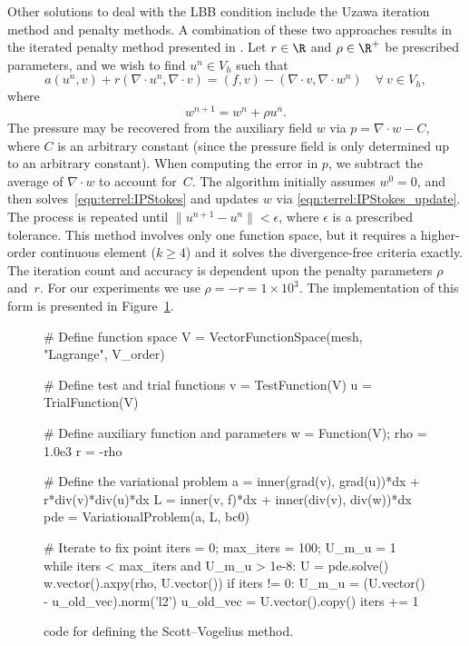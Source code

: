 Other solutions to deal with the LBB condition include the Uzawa
iteration method and penalty methods.  A combination of these two
approaches results in the iterated penalty method presented in
\citet{ScottVogelius1985}. Let $r \in \R$ and $\rho \in \R^{+}$ be
prescribed parameters, and we wish to find $u^n \in V_{h}$ such that
\begin{equation}
\label{eqn:terrel:IPStokes}
 a(u^n, v) + r(\nabla \cdot u^n, \nabla \cdot v)
      =  (f, v) - (\nabla\cdot v, \nabla \cdot w^n) \quad \forall \ v \in V_{h},
\end{equation}
%
where
%
\begin{equation}
\label{eqn:terrel:IPStokes_update}
   w^{n+1} = w^n + \rho u^n.
\end{equation}
%
The pressure may be recovered from the auxiliary field $w$ via $p =
\nabla\cdot w - C$, where $C$ is an arbitrary constant (since the
pressure field is only determined up to an arbitrary constant).
When computing the error in $p$, we subtract the average of $\nabla
\cdot w$ to account for~$C$. The algorithm initially assumes $w^0 =
0$, and then solves~\eqref{eqn:terrel:IPStokes} and updates $w$ via
\eqref{eqn:terrel:IPStokes_update}. The process is repeated until
$\|u^{n+1} - u^{n}\| < \epsilon$, where $\epsilon$ is a prescribed
tolerance. This method involves only one function space, but it
requires a higher-order continuous element ($k \ge 4$) and it solves the
divergence-free criteria exactly.  The iteration count and accuracy is
dependent upon the penalty parameters $\rho$ and~$r$.  For our experiments
we use $\rho = -r = 1 \times 10^{3}$.  The implementation of this form
is presented in Figure~\ref{code:terrel:var:ip}.
%
\begin{figure}
\begin{python}
# Define function space
V = VectorFunctionSpace(mesh, "Lagrange", V_order)

# Define test and trial functions
v = TestFunction(V)
u = TrialFunction(V)

# Define auxiliary function and parameters
w = Function(V);
rho = 1.0e3
r = -rho

# Define the variational problem
a = inner(grad(v), grad(u))*dx + r*div(v)*div(u)*dx
L = inner(v, f)*dx + inner(div(v), div(w))*dx
pde = VariationalProblem(a, L, bc0)

# Iterate to fix point
iters = 0; max_iters = 100; U_m_u = 1
while iters < max_iters and U_m_u > 1e-8:
    U = pde.solve()
    w.vector().axpy(rho, U.vector())
    if iters != 0:
        U_m_u = (U.vector() - u_old_vec).norm('l2')
    u_old_vec = U.vector().copy()
    iters += 1
\end{python}
\caption{\dolfin{} code for defining the Scott--Vogelius method.}
\label{code:terrel:var:ip}
\end{figure}


